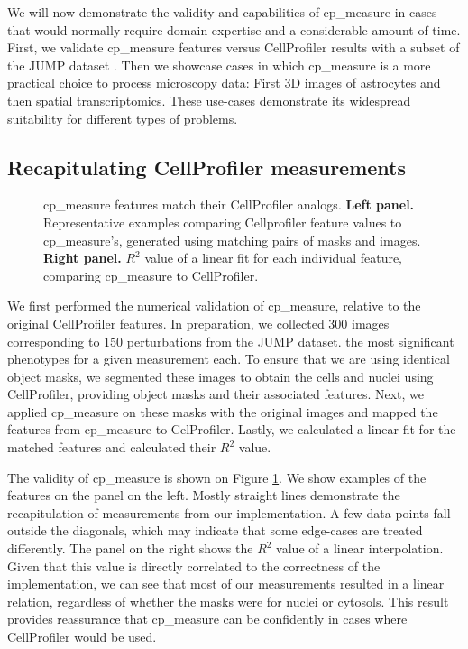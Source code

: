 \documentclass{article}
\begin{document}
We will now demonstrate the validity and capabilities of cp\_measure in cases that would normally require domain expertise and a considerable amount of time. First, we validate cp\_measure features versus CellProfiler results with a subset of the JUMP dataset \citep{chandrasekaranJUMPCellPainting2023}. Then we showcase cases in which cp\_measure is a more practical choice to process microscopy data: First 3D images of astrocytes and then spatial transcriptomics. These use-cases demonstrate its widespread suitability for different types of problems. 
\subsection{Recapitulating CellProfiler measurements}
\label{sec:org09b0cd2}

\begin{figure}[htbp]
\centering

\caption{\label{fig:cp_vs_cpmeasure}cp\_measure features match their CellProfiler analogs. \textbf{Left panel.} Representative examples comparing Cellprofiler feature values to cp\_measure's, generated using matching pairs of masks and images. \textbf{Right panel.} \(R^2\) value of a linear fit for each individual feature, comparing cp\_measure to CellProfiler.}
\end{figure}

We first performed the numerical validation of cp\_measure, relative to the original CellProfiler features. In preparation, we collected 300 images corresponding to 150 perturbations from the JUMP dataset. the most significant phenotypes for a given measurement each. To ensure that we are using identical object masks, we segmented these images to obtain the cells and nuclei using CellProfiler, providing object masks and their associated features. Next, we applied cp\_measure on these masks with the original images and mapped the features from cp\_measure to CelProfiler. Lastly, we calculated a linear fit for the matched features and calculated their \(R^2\) value.

The validity of cp\_measure is shown on Figure \ref{fig:cp_vs_cpmeasure}. We show examples of the features on the panel on the left. Mostly straight lines demonstrate the recapitulation of measurements from our implementation. A few data points fall outside the diagonals, which may indicate that some edge-cases are treated differently. The panel on the right shows the \(R^2\) value of a linear interpolation. Given that this value is directly correlated to the correctness of the implementation, we can see that most of our measurements resulted in a linear relation, regardless of whether the masks were for nuclei or cytosols. This result provides reassurance that cp\_measure can be confidently in cases where CellProfiler would be used.
\end{document}
